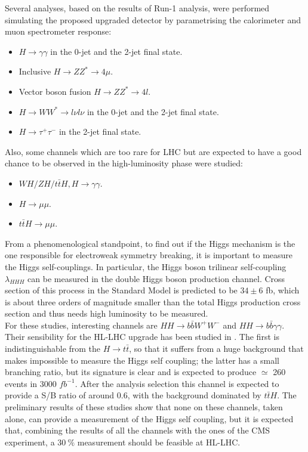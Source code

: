 \documentclass[a4paper,twoside,12pt]{book}
\begin{document}
Several analyses, based on the results of Run-1 analysis, were performed simulating the proposed upgraded
detector by parametrising the calorimeter and muon spectrometer response\cite{loi}\cite{scoping}:

\begin{itemize}
\item $H \rightarrow \gamma\gamma$ in the 0-jet and the 2-jet final state.
\item Inclusive $H \rightarrow ZZ^{*} \rightarrow 4\mu$.
\item Vector boson fusion $H \rightarrow ZZ^{*} \rightarrow 4l$.
\item $H \rightarrow WW^* \rightarrow l\nu l\nu$ in the 0-jet and the 2-jet final state.
\item $H \rightarrow \tau^+\tau^-$ in the 2-jet final state.
\end{itemize}

Also, some channels which are too rare for LHC but are expected to have a good chance
to be observed in the high-luminosity phase were studied:
\begin{itemize}
\item $WH/ZH/t\bar{t}H, H \rightarrow \gamma\gamma$.
\item $H \rightarrow \mu\mu$.
\item $t\bar{t}H \rightarrow \mu\mu$.
\end{itemize}


\bigskip
\bigskip
\bigskip


From a phenomenological standpoint, to find out if the Higgs mechanism is the one responsible
for electroweak symmetry breaking, it is important to measure the Higgs self-couplings.
In particular, the Higgs boson trilinear self-coupling $\lambda_{HHH}$ can be measured
in the double Higgs boson production channel. Cross section of this process in the Standard Model is
predicted to be $34 \pm 6$ fb, which is about three orders of magnitude
smaller than the total Higgs production cross section and thus needs high
luminosity to be measured. \\

For these studies, interesting channels are
$HH \rightarrow b\bar{b}W^+W^-$ and $HH \rightarrow b\bar{b}\gamma\gamma$. Their sensibility for the HL-LHC upgrade has been studied in \cite{HHStudies}. The first is 
indistinguishable from the $H \rightarrow t\bar{t}$, so that it suffers from a huge background
that makes impossible to measure the Higgs self coupling; the latter has a small branching
ratio, but its signature is clear and is expected to produce $\simeq$ 260 events in 3000 $fb^{-1}$. After the analysis selection this channel is expected to provide a S/B ratio of around 0.6, with the background
dominated by $t\bar{t}H$. The preliminary results of these
studies show that none on these channels, taken alone, can provide a measurement of
the Higgs self coupling, but it is expected that, combining the results of all the channels with 
the ones of the CMS experiment, a $30\ \%$ measurement should be feasible at HL-LHC.
\end{document}

